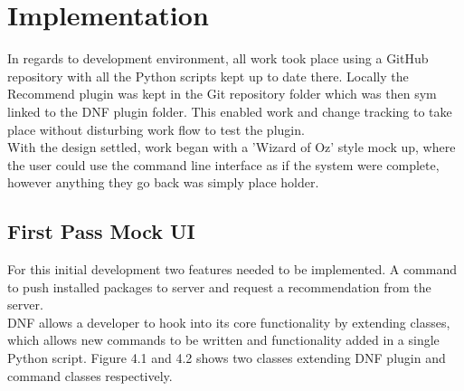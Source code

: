 \documentclass{l4proj}
\begin{document}
 
\chapter{Implementation}
In regards to development environment, all work took place using a GitHub repository with all the Python scripts kept up to date there. Locally the Recommend plugin was kept in the Git repository folder which was then sym linked to the DNF plugin folder. This enabled work and change tracking to take place without disturbing work flow to test the plugin.\\
With the design settled, work began with a 'Wizard of Oz'\cite{wizofoz} style mock up, where the user could use the command line interface as if the system were complete, however anything they go back was simply place holder.

\section{First Pass Mock UI}
For this initial development two features needed to be implemented. A command to push installed packages to server and request a recommendation from the server.\\
DNF allows a developer to hook into its core functionality by extending classes, which allows new commands to be written and functionality added in a single Python script. Figure 4.1 and 4.2 shows two classes extending DNF plugin and command classes respectively.
\begin{figure}

\end{figure}
\begin{figure}

\end{figure}
\end{document}
